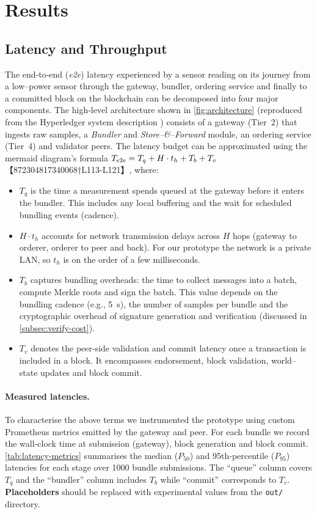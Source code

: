 \documentclass[12pt,onecolumn]{IEEEtran} %
\begin{document}
\section{Results}

\subsection{Latency and Throughput}
\label{subsec:latency-throughput}

The end‑to‑end (\textit{e2e}) latency experienced by a sensor reading on its
journey from a low–power sensor through the gateway, bundler, ordering service
and finally to a committed block on the blockchain can be decomposed into
four major components.  The high‑level architecture shown in
\autoref{fig:architecture} (reproduced from the Hyperledger system description
\citep{evaluation_metrics_doc}) consists of a gateway (Tier~2) that ingests
raw samples, a \emph{Bundler} and \emph{Store–\&–Forward} module, an ordering
service (Tier~4) and validator peers.  The latency budget can be
approximated using the mermaid diagram’s formula $T_{\rm e2e}=T_q + H \cdot t_h
 + T_b + T_v$【872304817340068†L113-L121】, where:

\begin{itemize}
  \item $T_q$ is the time a measurement spends queued at the gateway before it
  enters the bundler.  This includes any local buffering and the wait for
  scheduled bundling events (cadence).
  \item $H\cdot t_h$ accounts for network transmission delays across $H$ hops
  (gateway to orderer, orderer to peer and back).  For our prototype the
  network is a private LAN, so $t_h$ is on the order of a few milliseconds.
  \item $T_b$ captures bundling overheads: the time to collect messages into a
  batch, compute Merkle roots and sign the batch.  This value depends on the
  bundling cadence (e.g., 5~s), the number of samples per bundle and the
  cryptographic overhead of signature generation and verification (discussed in
  \autoref{subsec:verify-cost}).
  \item $T_v$ denotes the peer‑side validation and commit latency once a
  transaction is included in a block.  It encompasses endorsement, block
  validation, world–state updates and block commit.
\end{itemize}

\paragraph{Measured latencies.}  To characterise the above terms we instrumented
the prototype using custom Prometheus metrics emitted by the gateway and peer.
For each bundle we record the wall‑clock time at submission (gateway), block
generation and block commit.  \autoref{tab:latency-metrics} summarises the
median ($P_{50}$) and 95th‑percentile ($P_{95}$) latencies for each stage over
\num{1000} bundle submissions.  The ``queue'' column covers $T_q$ and the
``bundler'' column includes $T_b$ while ``commit'' corresponds to $T_v$.
\textbf{Placeholders} should be replaced with experimental values from the
\texttt{out/} directory.
\end{document}
